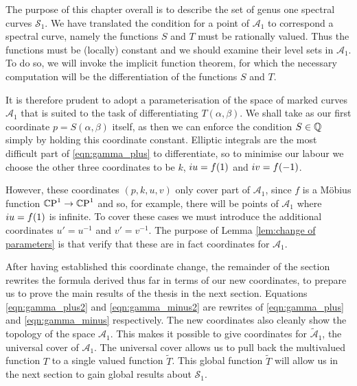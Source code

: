 The purpose of this chapter overall is to describe the set of genus one spectral curves $\mathcal{S}_1$. We have translated the condition for a point of $\mathcal{A}_1$ to correspond a spectral curve, namely the functions $S$ and $T$ must be rationally valued. Thus the functions must be (locally) constant and we should examine their level sets in $\mathcal{A}_1$. To do so, we will invoke the implicit function theorem, for which the necessary computation will be the differentiation of the functions $S$ and $T$.

It is therefore prudent to adopt a parameterisation of the space of marked curves $\mathcal{A}_1$ that is suited to the task of differentiating $T(α,β)$. We shall take as our first coordinate $p=S(α,β)$ itself, as then we can enforce the condition $S\in\Q$ simply by holding this coordinate constant. Elliptic integrals are the most difficult part of \eqref{eqn:gamma_plus} to differentiate, so to minimise our labour we choose the other three coordinates to be $k$, $i u = f(1)$ and $i v = f(-1)$.

However, these coordinates $(p,k,u,v)$ only cover part of $\mathcal{A}_1$, since $f$ is a M\"obius function $\CP^1 \to \CP^1$ and so, for example, there will be points of $\mathcal{A}_1$ where $i u = f(1)$ is infinite. To cover these cases we must introduce the additional coordinates $u' = u^{-1}$ and $v' = v^{-1}$. The purpose of Lemma \ref{lem:change of parameters} is that verify that these are in fact coordinates for $\mathcal{A}_1$.

After having established this coordinate change, the remainder of the section rewrites the formula derived thus far in terms of our new coordinates, to prepare us to prove the main results of the thesis in the next section. Equations \eqref{eqn:gamma_plus2} and \eqref{eqn:gamma_minus2} are rewrites of \eqref{eqn:gamma_plus} and \eqref{eqn:gamma_minus} respectively. The new coordinates also cleanly show the topology of the space $\mathcal{A}_1$. This makes it possible to give coordinates for $\mathcal{\tilde{A}}_1$, the universal cover of $\mathcal{A}_1$. The universal cover allows us to pull back the multivalued function $T$ to a single valued function $\tilde{T}$. This global function $\tilde{T}$ will allow us in the next section to gain global results about $\mathcal{S}_1$.

